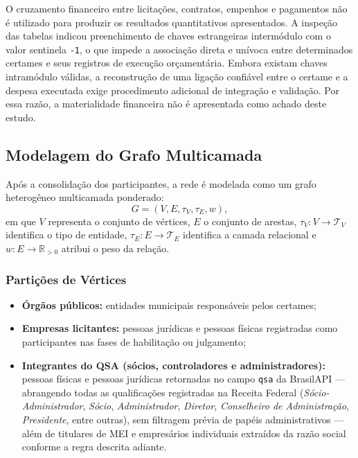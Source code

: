 O cruzamento financeiro entre licitações, contratos, empenhos e pagamentos não é utilizado para produzir os resultados quantitativos apresentados. A inspeção das tabelas indicou preenchimento de chaves estrangeiras intermódulo com o valor sentinela \texttt{-1}, o que impede a associação direta e unívoca entre determinados certames e seus registros de execução orçamentária. Embora existam chaves intramódulo válidas, a reconstrução de uma ligação confiável entre o certame e a despesa executada exige procedimento adicional de integração e validação. Por essa razão, a materialidade financeira não é apresentada como achado deste estudo.

\subsection{Modelagem do Grafo Multicamada}

Após a consolidação dos participantes, a rede é modelada como um grafo heterogêneo multicamada ponderado:
\begin{equation}
  G=(V,E,\tau_V,\tau_E,w),
  \label{eq:grafo_metodologia}
\end{equation}
em que $V$ representa o conjunto de vértices, $E$ o conjunto de arestas, $\tau_V:V\rightarrow\mathcal{T}_V$ identifica o tipo de entidade, $\tau_E:E\rightarrow\mathcal{T}_E$ identifica a camada relacional e $w:E\rightarrow\mathbb{R}_{>0}$ atribui o peso da relação.

\subsubsection{Partições de Vértices}

\begin{itemize}
  \item \textbf{Órgãos públicos:} entidades municipais responsáveis pelos certames;
  \item \textbf{Empresas licitantes:} pessoas jurídicas e pessoas físicas registradas como participantes nas fases de habilitação ou julgamento;
  \item \textbf{Integrantes do QSA (sócios, controladores e administradores):} pessoas físicas e pessoas jurídicas retornadas no campo \texttt{qsa} da BrasilAPI — abrangendo todas as qualificações registradas na Receita Federal (\textit{Sócio-Administrador}, \textit{Sócio}, \textit{Administrador}, \textit{Diretor}, \textit{Conselheiro de Administração}, \textit{Presidente}, entre outras), sem filtragem prévia de papéis administrativos — além de titulares de MEI e empresários individuais extraídos da razão social conforme a regra descrita adiante.
\end{itemize}

